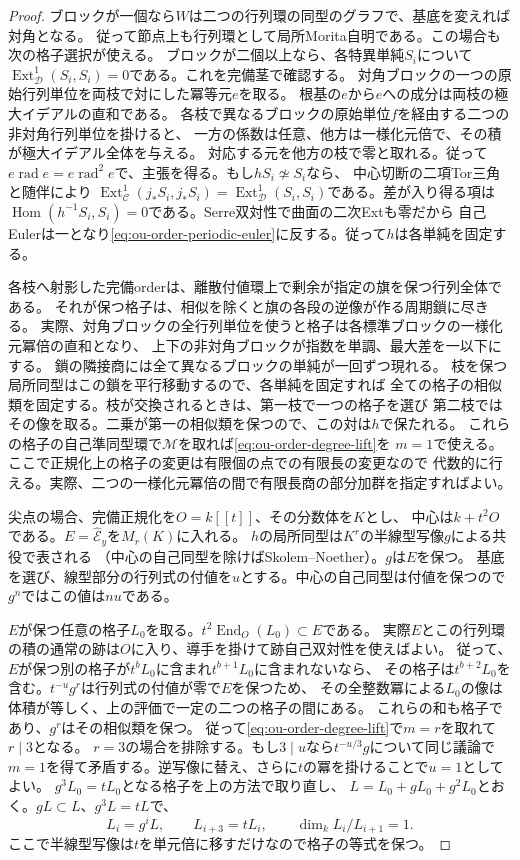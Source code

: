 \documentclass[11pt,a4paper]{ltjsarticle}
\theoremstyle{definition}
\begin{document}
\begin{proof}
ブロックが一個なら$W$は二つの行列環の同型のグラフで、基底を変えれば対角となる。
従って節点上も行列環として局所Morita自明である。この場合も次の格子選択が使える。
ブロックが二個以上なら、各特異単純$S_i$について
$\operatorname{Ext}^1_{\mathcal D}(S_i,S_i)=0$である。これを完備茎で確認する。
対角ブロックの一つの原始行列単位を両枝で対にした冪等元$e$を取る。
根基の$e$から$e$への成分は両枝の極大イデアルの直和である。
各枝で異なるブロックの原始単位$f$を経由する二つの非対角行列単位を掛けると、
一方の係数は任意、他方は一様化元倍で、その積が極大イデアル全体を与える。
対応する元を他方の枝で零と取れる。従って$e\operatorname{rad}e
=e\operatorname{rad}^2e$で、主張を得る。もし$hS_i\not\simeq S_i$なら、
中心切断の二項Tor三角と随伴により
$\operatorname{Ext}^1_{\mathcal C}(j_*S_i,j_*S_i)
=\operatorname{Ext}^1_{\mathcal D}(S_i,S_i)$である。差が入り得る項は
$\operatorname{Hom}(h^{-1}S_i,S_i)=0$である。Serre双対性で曲面の二次Extも零だから
自己Eulerは一となり\eqref{eq:ou-order-periodic-euler}に反する。従って$h$は各単純を固定する。

各枝へ射影した完備orderは、離散付値環上で剰余が指定の旗を保つ行列全体である。
それが保つ格子は、相似を除くと旗の各段の逆像が作る周期鎖に尽きる。
実際、対角ブロックの全行列単位を使うと格子は各標準ブロックの一様化元冪倍の直和となり、
上下の非対角ブロックが指数を単調、最大差を一以下にする。
鎖の隣接商には全て異なるブロックの単純が一回ずつ現れる。
枝を保つ局所同型はこの鎖を平行移動するので、各単純を固定すれば
全ての格子の相似類を固定する。枝が交換されるときは、第一枝で一つの格子を選び
第二枝ではその像を取る。二乗が第一の相似類を保つので、この対は$h$で保たれる。
これらの格子の自己準同型環で$\mathcal M$を取れば\eqref{eq:ou-order-degree-lift}を
$m=1$で使える。ここで正規化上の格子の変更は有限個の点での有限長の変更なので
代数的に行える。実際、二つの一様化元冪倍の間で有限長商の部分加群を指定すればよい。

尖点の場合、完備正規化を$O=k[[t]]$、その分数体を$K$とし、
中心は$k+t^2O$である。$E=\widehat{\mathcal E}_y$を$M_r(K)$に入れる。
$h$の局所同型は$K^r$の半線型写像$g$による共役で表される
（中心の自己同型を除けばSkolem--Noether）。$g$は$E$を保つ。
基底を選び、線型部分の行列式の付値を$u$とする。中心の自己同型は付値を保つので
$g^n$ではこの値は$nu$である。

$E$が保つ任意の格子$L_0$を取る。$t^2\operatorname{End}_O(L_0)\subset E$である。
実際$E$とこの行列環の積の通常の跡は$O$に入り、導手を掛けて跡自己双対性を使えばよい。
従って、$E$が保つ別の格子が$t^bL_0$に含まれ$t^{b+1}L_0$に含まれないなら、
その格子は$t^{b+2}L_0$を含む。$t^{-u}g^r$は行列式の付値が零で$E$を保つため、
その全整数冪による$L_0$の像は体積が等しく、上の評価で一定の二つの格子の間にある。
これらの和も格子であり、$g^r$はその相似類を保つ。
従って\eqref{eq:ou-order-degree-lift}で$m=r$を取れて$r\mid 3$となる。
$r=3$の場合を排除する。もし$3\mid u$なら$t^{-u/3}g$について同じ議論で
$m=1$を得て矛盾する。逆写像に替え、さらに$t$の冪を掛けることで$u=1$としてよい。
$g^3L_0=tL_0$となる格子を上の方法で取り直し、
$L=L_0+gL_0+g^2L_0$とおく。$gL\subset L$、$g^3L=tL$で、
\[
     L_i=g^iL,\qquad L_{i+3}=tL_i,\qquad\dim_k L_i/L_{i+1}=1 .
\]
ここで半線型写像は$t$を単元倍に移すだけなので格子の等式を保つ。


\end{proof}
\end{document}
